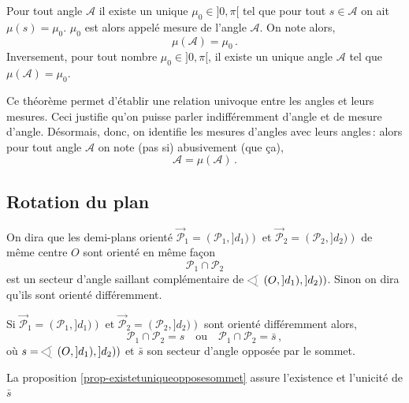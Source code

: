 \begin{thm}
Pour tout angle $\mathcal{A}$ il existe un unique $\mu_0\in ]0,\pi[$ tel que  pour tout $s \in \mathcal{A}$ on ait $\mu(s)=\mu_0$. $\mu_0$ est alors appelé mesure de l'angle $\mathcal{A}$. On note alors,
\begin{equation*}
    \mu\left(\mathcal{A}\right) = \mu_0\,. 
\end{equation*}
Inversement, pour tout nombre $\mu_0 \in ]0,\pi[$, il existe un unique angle $\mathcal{A}$ tel que $\mu\left(\mathcal{A}\right)=\mu_0$.
\end{thm}
\begin{rema}
    Ce théorème permet d'établir une relation univoque entre les angles et leurs mesures. Ceci justifie qu'on puisse parler indifféremment d'angle et de mesure d'angle. Désormais, donc, on identifie les mesures d'angles avec leurs angles\,: alors pour tout angle $\mathcal{A}$ on note (pas si) abusivement (que ça),
    \begin{equation*}
        \mathcal{A} = \mu \left(\mathcal{A}\right)\,.
    \end{equation*}
\end{rema}

        \subsection{Rotation du plan}

\begin{defi}
On dira que les demi-plans orienté $\overrightarrow{\mathcal{P}}_1 = \left(\mathcal{P}_1,]d_1)\right)$ et $\overrightarrow{\mathcal{P}}_2 = \left(\mathcal{P}_2,]d_2)\right)$ de même centre $O$ sont orienté en même façon \ssi
\begin{equation*}
    \mathcal{P}_1 \cap \mathcal{P}_2 %
\end{equation*}
est un secteur d'angle saillant complémentaire de $\anglesaillant \left(O,]d_1),]d_2)\right)$. Sinon on dira qu'ils sont orienté différemment.
\end{defi}
\begin{rema}
    Si $\overrightarrow{\mathcal{P}}_1 = \left(\mathcal{P}_1,]d_1)\right)$ et $\overrightarrow{\mathcal{P}}_2 = \left(\mathcal{P}_2,]d_2)\right)$ sont orienté différemment alors,
\begin{equation*}
    \mathcal{P}_1 \cap \mathcal{P}_2 = s \quad \text{ou}\quad \mathcal{P}_1 \cap \mathcal{P}_2 = \bar{s}\,,
\end{equation*}
où $s = \anglesaillant \left(O,]d_1),]d_2)\right)$ et $\bar{s}$ son secteur d'angle opposée par le sommet. 
\end{rema}
\begin{rema}
    La proposition \ref{prop-existetuniqueopposesommet} assure l'existence et l'unicité de $\bar{s}$
\end{rema}

